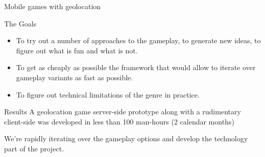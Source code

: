 \documentclass[aspectratio=169,handout,bigger]{beamer}
\begin{document}
\begin{frame}{Mobile games with geolocation}
\end{frame}


\begin{frame}{The Goals}
  \begin{itemize}
    \item To try out a number of approaches to the gameplay,
          to generate new ideas,
          to figure out what is fun and what is not.
    \item To get as cheaply as possible the framework that would allow
          to iterate over gameplay variants as fast as possible.
    \item To figure out technical limitations of the genre in practice.
  \end{itemize}
\end{frame}


\begin{frame}{Results}
  A geolocation game server-side prototype along with a rudimentary
  client-side was developed in less than 100 man-hours (2 calendar months)
  \vspace*{1em}\par
  We're rapidly iterating over the gameplay options
  and develop the technology part of the project.
\end{frame}
\end{document}
